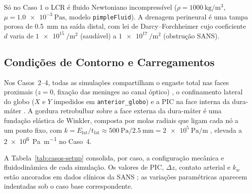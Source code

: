 \documentclass[article, hidelinks,oneside,12pt]{abntex2}
\begin{document}
Só no Caso 1 o LCR é fluido Newtoniano incompressível ($\rho = \SI{1000}{\kilogram\per\meter\cubed}$, $\mu = \SI{1.0e-3}{\pascal\second}$, modelo \texttt{pimpleFluid}). A drenagem perineural é uma tampa porosa de \SI{0.5}{\milli\meter} na saída distal, com lei de Darcy--Forchheimer cujo coeficiente $d$ varia de $\SI{1e15}{\per\meter\squared}$ (saudável) a $\SI{1e17}{\per\meter\squared}$ (obstrução SANS).


\subsection*{Condições de Contorno e Carregamentos}
\label{sec:met-contorno}

Nos Casos~2--4, todas as simulações compartilham o engaste total nas faces proximais ($z = 0$, fixação das meninges ao canal óptico) \cite{wang2016}, o confinamento lateral do globo ($X$ e $Y$ impedidos em \texttt{anterior\_globo}) e a PIC na face interna da dura-máter \cite{feola2016, wang2016}. A gordura retrobulbar sobre a face externa da dura-máter é uma fundação elástica de Winkler, composta por molas radiais que ligam cada nó a um ponto fixo, com $k = E_{\mathrm{fat}}/t_{\mathrm{fat}} \approx \SI{500}{\pascal}/\SI{2.5}{\milli\meter} = \SI{2e5}{\pascal\per\meter}$ \cite{schoemaker2006, yoo2011}, elevada a \SI{2e6}{\pascal\per\meter} no Caso~4.

A Tabela~\ref{tab:casos-setup} consolida, por caso, a configuração mecânica e fluidodinâmica de cada simulação. Os valores de PIC, $\Delta z$, contato arterial e $k_w$ estão ancorados em dados clínicos da SANS \cite{lee2020, mader2011, lawley2017, reilly2023, feola2016}; as variações paramétricas aparecem indentadas sob o caso base correspondente.
\end{document}

